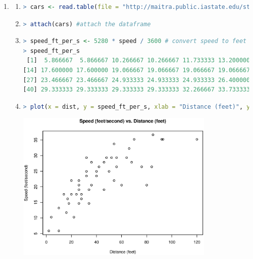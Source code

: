 \documentclass{article}
\begin{document}
\begin{enumerate}[leftmargin = 0 em, label = \arabic*., font = \bfseries]
\item \begin{enumerate}
	\item 
\begin{lstlisting}[language = R]
> cars <- read.table(file = "http://maitra.public.iastate.edu/stat579/datasets/cars.dat", header = T) # read the file
\end{lstlisting}

\item
\begin{lstlisting}[language = R]
> attach(cars) #attach the dataframe
\end{lstlisting}

\item
\begin{lstlisting}[language = R]
> speed_ft_per_s <- 5280 * speed / 3600 # convert speed to feet per second
> speed_ft_per_s
 [1]  5.866667  5.866667 10.266667 10.266667 11.733333 13.200000 14.666667 14.666667 14.666667 16.133333 16.133333 17.600000 17.600000
[14] 17.600000 17.600000 19.066667 19.066667 19.066667 19.066667 20.533333 20.533333 20.533333 20.533333 22.000000 22.000000 22.000000
[27] 23.466667 23.466667 24.933333 24.933333 24.933333 26.400000 26.400000 26.400000 26.400000 27.866667 27.866667 27.866667 29.333333
[40] 29.333333 29.333333 29.333333 29.333333 32.266667 33.733333 35.200000 35.200000 35.200000 35.200000 36.666667
\end{lstlisting}

\item
\begin{lstlisting}[language = R]
> plot(x = dist, y = speed_ft_per_s, xlab = "Distance (feet)", ylab = "Speed (feet/second)", main = "Speed (feet/second) vs. Distance (feet)") # plot speed (feet/second) against distance (feet)
\end{lstlisting}

\begin{center}
	\includegraphics[width = 0.8\textwidth]{speed_vs_dist_ft.eps}
\end{center}


\end{enumerate}
\end{enumerate}
\end{document}
